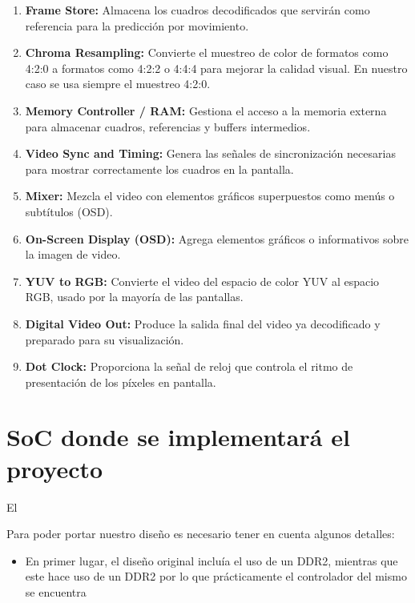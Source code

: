 \message{ !name(CIA_2025_Esteban_Bustamante.tex)}\documentclass[conference]{IEEEtran}
\begin{document}
\begin{enumerate}
  \item \textbf{Frame Store:} Almacena los cuadros decodificados que servirán como referencia para la predicción por movimiento.

  \item \textbf{Chroma Resampling:} Convierte el muestreo de color de formatos como 4:2:0 a formatos como 4:2:2 o 4:4:4 para mejorar la calidad visual. En nuestro caso se usa siempre el muestreo 4:2:0.

  \item \textbf{Memory Controller / RAM:} Gestiona el acceso a la memoria externa para almacenar cuadros, referencias y buffers intermedios.

  \item \textbf{Video Sync and Timing:} Genera las señales de sincronización necesarias para mostrar correctamente los cuadros en la pantalla.

  \item \textbf{Mixer:} Mezcla el video con elementos gráficos superpuestos como menús o subtítulos (OSD).

  \item \textbf{On-Screen Display (OSD):} Agrega elementos gráficos o informativos sobre la imagen de video.

  \item \textbf{YUV to RGB:} Convierte el video del espacio de color YUV al espacio RGB, usado por la mayoría de las pantallas.

  \item \textbf{Digital Video Out:} Produce la salida final del video ya decodificado y preparado para su visualización.

  \item \textbf{Dot Clock:} Proporciona la señal de reloj que controla el ritmo de presentación de los píxeles en pantalla.
\end{enumerate}

\section{SoC donde se implementará el proyecto}
El

\label{sec:soc-donde-se}
Para poder portar nuestro diseño es necesario tener en cuenta algunos detalles:
\begin{itemize}
\item En primer lugar, el diseño original incluía el uso de un DDR2, mientras que este hace uso de un DDR2 por lo que prácticamente el controlador del mismo se encuentra 
\end{itemize}

\nocite{*}
\pagebreak
\newpage




\end{document}
